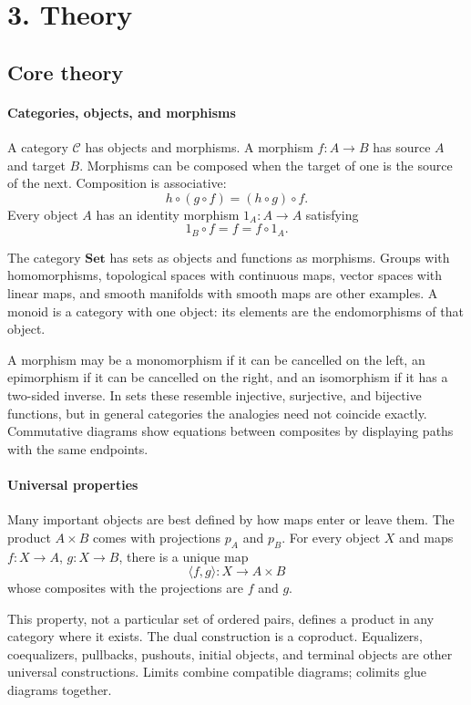 \section*{3. Theory}
\subsection*{Core theory}
\paragraph{Categories, objects, and morphisms}

A category $\mathcal C$ has objects and morphisms. A morphism $f:A\to B$ has source $A$ and target $B$. Morphisms can be composed when the target of one is the source of the next. Composition is associative:
\[
 h\circ(g\circ f)=(h\circ g)\circ f.
\]
Every object $A$ has an identity morphism $1_A:A\to A$ satisfying
\[
 1_B\circ f=f=f\circ1_A.
\]

The category $\mathbf{Set}$ has sets as objects and functions as morphisms. Groups with homomorphisms, topological spaces with continuous maps, vector spaces with linear maps, and smooth manifolds with smooth maps are other examples. A monoid is a category with one object: its elements are the endomorphisms of that object.

A morphism may be a monomorphism if it can be cancelled on the left, an epimorphism if it can be cancelled on the right, and an isomorphism if it has a two-sided inverse. In sets these resemble injective, surjective, and bijective functions, but in general categories the analogies need not coincide exactly. Commutative diagrams show equations between composites by displaying paths with the same endpoints.

\paragraph{Universal properties}

Many important objects are best defined by how maps enter or leave them. The product $A\times B$ comes with projections $p_A$ and $p_B$. For every object $X$ and maps $f:X\to A$, $g:X\to B$, there is a unique map
\[
 \langle f,g\rangle:X\to A\times B
\]
whose composites with the projections are $f$ and $g$.

This property, not a particular set of ordered pairs, defines a product in any category where it exists. The dual construction is a coproduct. Equalizers, coequalizers, pullbacks, pushouts, initial objects, and terminal objects are other universal constructions. Limits combine compatible diagrams; colimits glue diagrams together.

